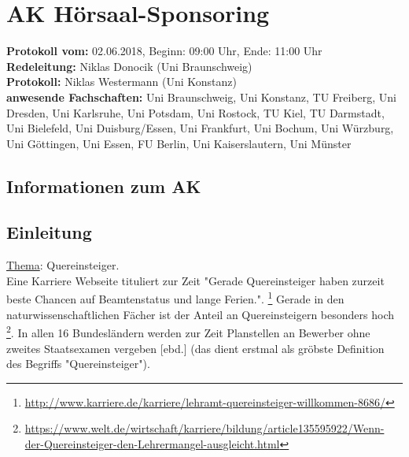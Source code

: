 
\section{AK Hörsaal-Sponsoring}

	\textbf{Protokoll vom:} 02.06.2018,
	Beginn: 09:00 Uhr,
	Ende: 11:00 Uhr \\
	\textbf{Redeleitung:} Niklas Donocik (Uni Braunschweig) \\
	\textbf{Protokoll:} Niklas Westermann (Uni Konstanz) \\
	\textbf{anwesende Fachschaften:} Uni Braunschweig, Uni Konstanz, TU Freiberg, Uni Dresden, Uni Karlsruhe, Uni Potsdam, Uni Rostock, TU Kiel, TU Darmstadt, Uni Bielefeld, Uni Duisburg/Essen, Uni Frankfurt, Uni Bochum, Uni Würzburg, Uni Göttingen, Uni Essen, FU Berlin, Uni Kaiserslautern, Uni Münster

	\subsection*{Informationen zum AK}

  \subsection*{Einleitung}
    \label{sec:Einleitung}
    \underline{Thema}: Quereinsteiger. \\
    Eine Karriere Webseite tituliert zur Zeit "Gerade Quereinsteiger haben zurzeit beste Chancen auf Beamtenstatus und lange Ferien.". \footnote{\label{foot:1}\url{http://www.karriere.de/karriere/lehramt-quereinsteiger-willkommen-8686/}} Gerade in den naturwissenschaftlichen Fächer ist der Anteil an Quereinsteigern besonders hoch \footnote{\url{https://www.welt.de/wirtschaft/karriere/bildung/article135595922/Wenn-der-Quereinsteiger-den-Lehrermangel-ausgleicht.html}}. In allen 16 Bundesländern werden zur Zeit Planstellen an Bewerber ohne zweites Staatsexamen vergeben [ebd.] (das dient erstmal als gröbste Definition des Begriffs "Quereinsteiger"). \\

